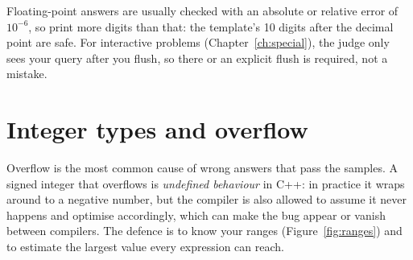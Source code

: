 Floating-point answers are usually checked with an absolute or relative error of $10^{-6}$, so print more digits than
that: the template's 10 digits after the decimal point are safe. For interactive problems (Chapter~\ref{ch:special}), the
judge only sees your query after you flush, so there  or an explicit flush is required, not a mistake.

\section[Integer types and overflow]{Integer types and overflow \hfill \bronze}\label{sec:overflow}

Overflow is the most common cause of wrong answers that pass the samples. A signed integer that overflows is
\emph{undefined behaviour} in C++: in practice it wraps around to a negative number, but the compiler is also allowed to
assume it never happens and optimise accordingly, which can make the bug appear or vanish between compilers. The defence is to
know your ranges (Figure~\ref{fig:ranges}) and to estimate the largest value every expression can reach.

